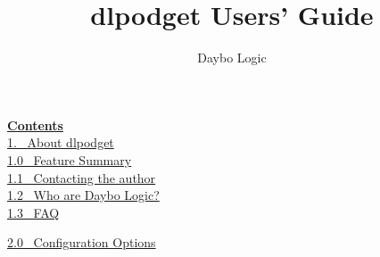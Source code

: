 \documentclass{article}
\begin{document}
\title{dlpodget Users' Guide}\author{Daybo Logic}
\maketitle

\par\vspace*{\fill}
\begin{center}

\end{center}

\newpage
\par \textbf{\underline{Contents}}
\\
\href{#about}{1.~ About dlpodget}
\\
\href{#features}{1.0~ Feature Summary}
\\
\href{#contact}{1.1~ Contacting the author}
\\
\href{#daybologic}{1.2~ Who are Daybo Logic?}
\\
\href{#faq}{1.3~ FAQ}

\par \href{#listings}{2.0~ Configuration Options}\\
\end{document}
